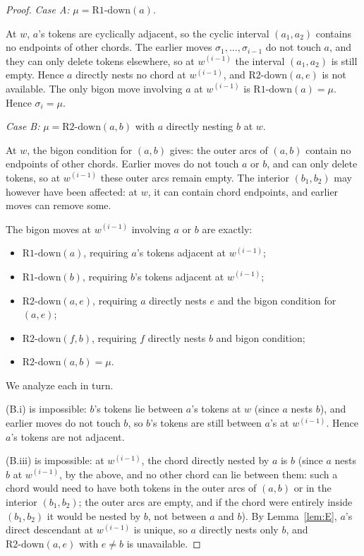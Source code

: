 \begin{proof}
\emph{Case A:} $\mu = \text{R1-down}(a)$.

At $w$, $a$'s tokens are cyclically adjacent, so the cyclic interval
$(a_1, a_2)$ contains no endpoints of other chords. The earlier
moves $\sigma_1, \dots, \sigma_{i-1}$ do not touch $a$, and they can
only delete tokens elsewhere, so at $w^{(i-1)}$ the interval
$(a_1, a_2)$ is still empty. Hence $a$ directly nests no chord at
$w^{(i-1)}$, and $\text{R2-down}(a, e)$ is not available. The only
bigon move involving $a$ at $w^{(i-1)}$ is $\text{R1-down}(a) = \mu$.
Hence $\sigma_i = \mu$.

\emph{Case B:} $\mu = \text{R2-down}(a, b)$ with $a$ directly nesting
$b$ at $w$.

At $w$, the bigon condition for $(a, b)$ gives: the outer arcs of
$(a, b)$ contain no endpoints of other chords. Earlier moves do not
touch $a$ or $b$, and can only delete tokens, so at $w^{(i-1)}$ these
outer arcs remain empty. The interior $(b_1, b_2)$ may however have
been affected: at $w$, it can contain chord endpoints, and earlier
moves can remove some.

The bigon moves at $w^{(i-1)}$ involving $a$ or $b$ are exactly:
\begin{itemize}
\item[(B.i)] $\text{R1-down}(a)$, requiring $a$'s tokens adjacent at
  $w^{(i-1)}$;
\item[(B.ii)] $\text{R1-down}(b)$, requiring $b$'s tokens adjacent at
  $w^{(i-1)}$;
\item[(B.iii)] $\text{R2-down}(a, e)$, requiring $a$ directly nests
  $e$ and the bigon condition for $(a, e)$;
\item[(B.iv)] $\text{R2-down}(f, b)$, requiring $f$ directly nests
  $b$ and bigon condition;
\item[(B.v)] $\text{R2-down}(a, b) = \mu$.
\end{itemize}

We analyze each in turn.

(B.i) is impossible: $b$'s tokens lie between $a$'s tokens at $w$
(since $a$ nests $b$), and earlier moves do not touch $b$, so $b$'s
tokens are still between $a$'s at $w^{(i-1)}$. Hence $a$'s tokens are
not adjacent.

(B.iii) is impossible: at $w^{(i-1)}$, the chord directly nested by
$a$ is $b$ (since $a$ nests $b$ at $w^{(i-1)}$, by the above, and no
other chord can lie between them: such a chord would need to have
both tokens in the outer arcs of $(a, b)$ or in the interior
$(b_1, b_2)$; the outer arcs are empty, and if the chord were entirely
inside $(b_1, b_2)$ it would be nested by $b$, not between $a$ and
$b$). By Lemma~\ref{lem:E}, $a$'s direct descendant at $w^{(i-1)}$ is
unique, so $a$ directly nests only $b$, and $\text{R2-down}(a, e)$
with $e \neq b$ is unavailable.


\end{proof}
